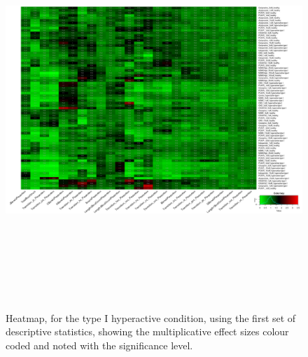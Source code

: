 \documentclass[a4paper,12pt]{article}
\begin{document}
\begin{figure}[h!]
\begin{center}
\includegraphics[width=16cm,height=15cm]{DarkApoHigh_heatmap_all_DarkApoHigh_B2MAP.png}
\caption{Heatmap, for the type I hyperactive condition, using the first set of descriptive statistics, showing the multiplicative effect sizes colour coded and noted with the significance level.}
\end{center}
\end{figure}
\newpage
\end{document}
